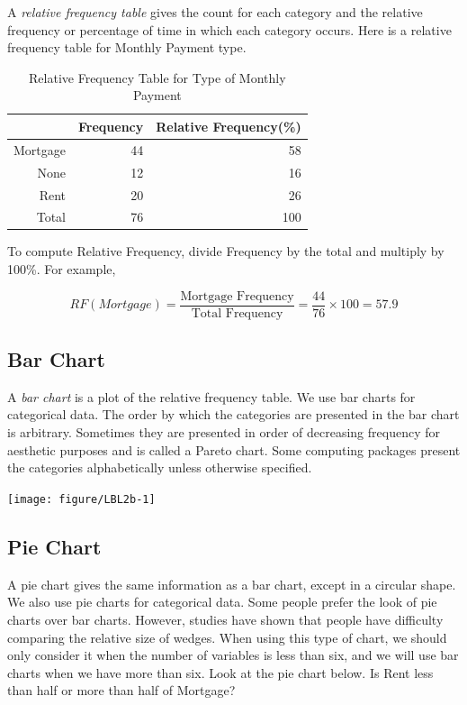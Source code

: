 \documentclass[11pt, chapterprefix=true]{scrbook}\usepackage[]{graphicx}\usepackage[]{color}
\begin{document}
A \textit{relative frequency table} gives the count for each category and the relative frequency or percentage of time in which each category occurs.  Here is a relative frequency table for Monthly Payment type.

\begin{table}[ht]
\centering
\begin{tabular}{rrr}
  \hline
 & Frequency & Relative Frequency(\%) \\ 
  \hline
Mortgage & 44 & 58 \\ 
  None & 12 & 16 \\ 
  Rent & 20 & 26 \\ 
  Total & 76 & 100 \\ 
   \hline
\end{tabular}
\caption{Relative Frequency Table for Type of Monthly Payment} 
\end{table}


To compute Relative Frequency, divide Frequency by the total and multiply by 100\%.  For example,

\begin{equation*}
RF(Mortgage) = \frac{\text{Mortgage Frequency}}{\text{Total Frequency}} = \frac{44}{76} \times 100 = 57.9
\end{equation*}

\subsection{Bar Chart}

A \textit{bar chart} is a plot of the relative frequency table.  We use bar charts for categorical data. The order by which the categories are presented in the bar chart is arbitrary. Sometimes they are presented in order of decreasing frequency for aesthetic purposes and is called a Pareto chart.  Some computing packages present the categories alphabetically unless otherwise specified.



{\centering \texttt{[image: figure/LBL2b-1]} 

}




\subsection{Pie Chart}

A pie chart gives the same information as a bar chart, except in a circular shape.  We also use pie charts for categorical data. Some people prefer the look of pie charts over bar charts.  However, studies have shown that people have difficulty comparing the relative size of wedges.  When using this type of chart, we should only consider it when the number of variables is less than six, and we will use bar charts when we have more than six.  Look at the pie chart below.  Is Rent less than half or more than half of Mortgage?
\end{document}
